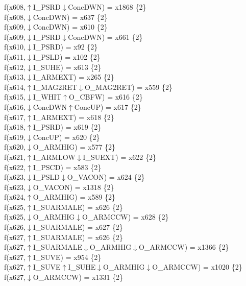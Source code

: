 f(x608,$\uparrow$I\_PSRD$\downarrow$ConcDWN) = x1868 \{2\} \\  
f(x608,$\downarrow$ConcDWN) = x637 \{2\} \\  
f(x609,$\downarrow$ConcDWN) = x610 \{2\} \\  
f(x609,$\downarrow$I\_PSRD$\downarrow$ConcDWN) = x661 \{2\} \\  
f(x610,$\downarrow$I\_PSRD) = x92 \{2\} \\  
f(x611,$\downarrow$I\_PSLD) = x102 \{2\} \\  
f(x612,$\downarrow$I\_SUHE) = x613 \{2\} \\  
f(x613,$\downarrow$I\_ARMEXT) = x265 \{2\} \\  
f(x614,$\uparrow$I\_MAG2RET$\downarrow$O\_MAG2RET) = x559 \{2\} \\  
f(x615,$\downarrow$I\_WHIT$\uparrow$O\_CBFW) = x616 \{2\} \\  
f(x616,$\downarrow$ConcDWN$\uparrow$ConcUP) = x617 \{2\} \\  
f(x617,$\uparrow$I\_ARMEXT) = x618 \{2\} \\  
f(x618,$\uparrow$I\_PSRD) = x619 \{2\} \\  
f(x619,$\downarrow$ConcUP) = x620 \{2\} \\  
f(x620,$\downarrow$O\_ARMHIG) = x577 \{2\} \\  
f(x621,$\uparrow$I\_ARMLOW$\downarrow$I\_SUEXT) = x622 \{2\} \\  
f(x622,$\uparrow$I\_PSCD) = x583 \{2\} \\  
f(x623,$\downarrow$I\_PSLD$\downarrow$O\_VACON) = x624 \{2\} \\  
f(x623,$\downarrow$O\_VACON) = x1318 \{2\} \\  
f(x624,$\uparrow$O\_ARMHIG) = x589 \{2\} \\  
f(x625,$\uparrow$I\_SUARMALE) = x626 \{2\} \\  
f(x625,$\downarrow$O\_ARMHIG$\downarrow$O\_ARMCCW) = x628 \{2\} \\  
f(x626,$\downarrow$I\_SUARMALE) = x627 \{2\} \\  
f(x627,$\uparrow$I\_SUARMALE) = x626 \{2\} \\  
f(x627,$\uparrow$I\_SUARMALE$\downarrow$O\_ARMHIG$\downarrow$O\_ARMCCW) = x1366 \{2\} \\  
f(x627,$\uparrow$I\_SUVE) = x954 \{2\} \\  
f(x627,$\uparrow$I\_SUVE$\uparrow$I\_SUHE$\downarrow$O\_ARMHIG$\downarrow$O\_ARMCCW) = x1020 \{2\} \\  
f(x627,$\downarrow$O\_ARMCCW) = x1331 \{2\} \\  
